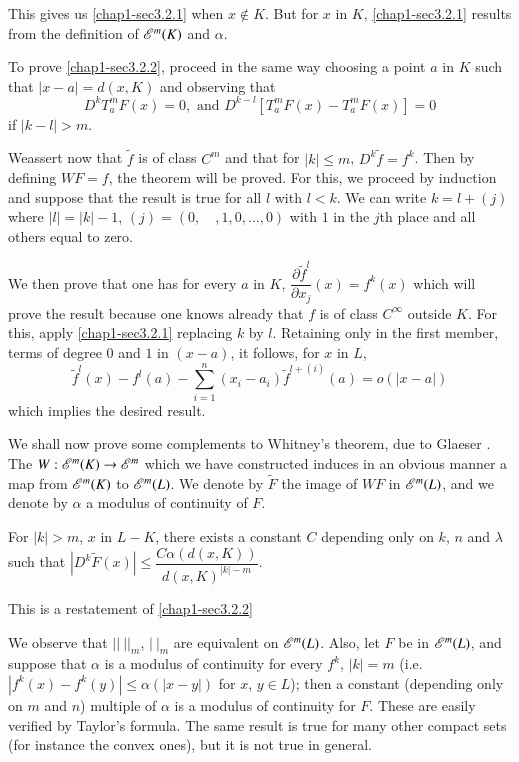 This gives us \eqref{chap1-sec3.2.1} when $x\not\in K$. But for $x$ in $K$, \eqref{chap1-sec3.2.1} results from the definition of $\mathscr{E}^{m}(K)$ and $\alpha$.

To prove \eqref{chap1-sec3.2.2}, proceed in the same way choosing a point $a$ in $K$ such that $|x-a|=d(x,K)$ and observing that
$$
D^{k}T^{m}_{a}F(x)=0,\text{ and } D^{k-l}[T^{m}_{a}F(x)-T^{m}_{a}F(x)]=0
$$
if $|k-l|>m$.

\eject

We\pageoriginale assert now that $\widetilde{f}$ is of class $C^{m}$ and that for $|k|\leq m$, $D^{k}\widetilde{f}=f^{k}$. Then by defining $WF=f$, the theorem will be proved. For this, we proceed by induction and suppose that the result is true for all $l$ with $l<k$. We can write $k=l+(j)$ where $|l|=|k|-1$, $(j)=(0,\quad ,1,0,\ldots,0)$ with $1$ in the $j$th place and all others equal to zero.

We then prove that one has for every $a$ in $K$, $\dfrac{\partial \widetilde{f}^{l}}{\partial x_{j}}(x)=f^{k}(x)$ which will prove the result because one knows already that $f$ is of class $C^{\infty}$ outside $K$. For this, apply \eqref{chap1-sec3.2.1} replacing $k$ by $l$. Retaining only in the first member, terms of degree $0$ and $1$ in $(x-a)$, it follows, for $x$ in $L$,
$$
\widetilde{f}^{l}(x)-f^{l}(a)-\sum\limits^{n}_{i=1}(x_{i}-a_{i})\widetilde{f}^{l+(i)}(a)=o(|x-a|)
$$
which implies the desired result.

We shall now prove some complements to Whitney's theorem, due to Glaeser \cite{G. Glaeser: 1}. The $W:\mathscr{E}^{m}(K)\to \mathscr{E}^{m}$ which we have constructed induces in an obvious manner a map from $\mathscr{E}^{m}(K)$ to $\mathscr{E}^{m}(L)$. We denote by $\widetilde{F}$ the image of $WF$ in $\mathscr{E}^{m}(L)$, and we denote by $\alpha$ a modulus of continuity of $F$.

\begin{Complement}\label{chap1-com3.3}
For $|k|>m$, $x$ in $L-K$, there exists a constant $C$ depending only on $k$, $n$ and $\lambda$ such that $|D^{k}\widetilde{F}(x)|\leq \dfrac{C\alpha(d(x,K))}{d(x,K)^{|k|-m}}$.
\end{Complement}

This is a restatement of \eqref{chap1-sec3.2.2}

\begin{remark}\label{chap1-rem3.4}
We observe that $||~||_{m}$, $|~|_{m}$ are equivalent on $\mathscr{E}^{m}(L)$. Also, let $F$ be in $\mathscr{E}^{m}(L)$, and suppose that $\alpha$ is a modulus of continuity for every $f^{k}$, $|k|=m$ (i.e. $|f^{k}(x)-f^{k}(y)|\leq \alpha(|x-y|)$ for $x$, $y\in L$); then a constant (depending only on $m$ and $n$) multiple of $\alpha$ is a modulus of continuity for $F$. These are easily verified by Taylor's formula. The same result is true for many other compact sets (for instance the convex ones), but it is not true in general.
\end{remark}

